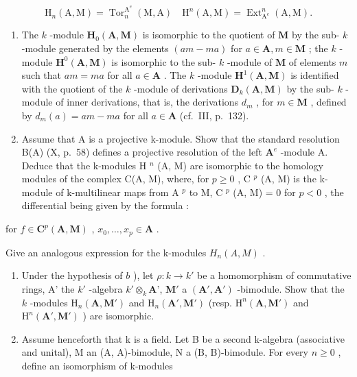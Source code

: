 \[
\mathrm{H} _ {n} (\mathrm{A}, \mathrm{M}) = \operatorname{Tor} _ {n} ^ {\mathrm{A} ^ {e}} (\mathrm{M}, \mathrm{A}) \quad \mathrm{H} ^ {n} (\mathrm{A}, \mathrm{M}) = \operatorname{Ext} _ {\mathrm{A} ^ {e}} ^ {n} (\mathrm{A}, \mathrm{M}).
\]

\begin{enumerate}
\def\labelenumi{\alph{enumi})}
\item
  The \(k\) -module \(\mathbf{H}_0(\mathbf{A}, \mathbf{M})\) is isomorphic to the quotient of \(\mathbf{M}\) by the sub- \(k\) -module generated by the elements \((am - ma)\) for \(a \in \mathbf{A}, m \in \mathbf{M}\) ; the \(k\) -module \(\mathbf{H}^0(\mathbf{A}, \mathbf{M})\) is isomorphic to the sub- \(k\) -module of \(\mathbf{M}\) of elements \(m\) such that \(am = ma\) for all \(a \in \mathbf{A}\) . The \(k\) -module \(\mathbf{H}^1(\mathbf{A}, \mathbf{M})\) is identified with the quotient of the \(k\) -module of derivations \(\mathbf{D}_k(\mathbf{A}, \mathbf{M})\) by the sub- \(k\) -module of inner derivations, that is, the derivations \(d_m\) , for \(m \in \mathbf{M}\) , defined by \(d_m(a) = am - ma\) for all \(a \in \mathbf{A}\) (cf.~III, p.~132).
\item
  Assume that A is a projective k-module. Show that the standard resolution B(A) (X, p.~58) defines a projective resolution of the left \(\mathbf{A}^{e}\) -module A. Deduce that the k-modules H \(^{n}\) (A, M) are isomorphic to the homology modules of the complex C(A, M), where, for \(p \geqslant 0\) , C \(^{p}\) (A, M) is the k-module of k-multilinear maps from A \(^{p}\) to M, C \(^{p}\) (A, M) = 0 for \(p < 0\) , the differential being given by the formula :
\end{enumerate}

for \(f \in \mathbf{C}^p(\mathbf{A}, \mathbf{M})\) , \(x_0, \ldots, x_p \in \mathbf{A}\) .

Give an analogous expression for the k-modules \(H_{n}(A, M)\) .

\begin{enumerate}
\def\labelenumi{\alph{enumi})}
\setcounter{enumi}{2}
\item
  Under the hypothesis of \(b\) ), let \(\rho : k \to k'\) be a homomorphism of commutative rings, A' the \(k'\) -algebra \(k' \otimes_k \mathbf{A}\)', \(\mathbf{M}'\) a \((\mathbf{A}', \mathbf{A}')\) -bimodule. Show that the \(k\) -modules \(\mathrm{H}_n(\mathbf{A}, \mathbf{M}')\) and \(\mathrm{H}_n(\mathbf{A}', \mathbf{M}')\) (resp. \(\mathrm{H}^n(\mathbf{A}, \mathbf{M}')\) and \(\mathrm{H}^n(\mathbf{A}', \mathbf{M}')\) ) are isomorphic.
\item
  Assume henceforth that k is a field. Let B be a second k-algebra (associative and unital), M an (A, A)-bimodule, N a (B, B)-bimodule. For every \(n \geqslant 0\) , define an isomorphism of k-modules
\end{enumerate}

